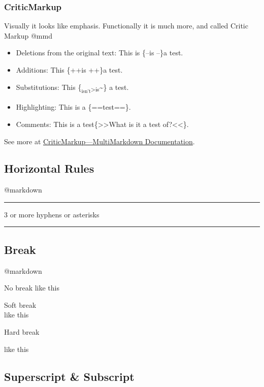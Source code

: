 \documentclass[]{article}
\providecommand{\tightlist}{%
  \setlength{\itemsep}{0pt}\setlength{\parskip}{0pt}}
\begin{document}
\subsubsection{CriticMarkup}\label{criticmarkup}

Visually it looks like emphasis. Functionally it is much more, and
called Critic Markup @mmd

\begin{itemize}
\tightlist
\item
  Deletions from the original text: This is \{--is --\}a test.
\item
  Additions: This \{++is ++\}a test.
\item
  Substitutions: This
  \{\textsubscript{\textsubscript{isn't}\textgreater{}is}\textasciitilde{}\}
  a test.
\item
  Highlighting: This is a \{==test==\}.
\item
  Comments: This is a test\{\textgreater{}\textgreater{}What is it a
  test of?\textless{}\textless{}\}.
\end{itemize}

See more at
\href{http://fletcher.github.io/MultiMarkdown-5/criticmarkup.html}{CriticMarkup---MultiMarkdown
Documentation}.

\subsection{Horizontal Rules}\label{horizontal-rules}

@markdown

\begin{center}\rule{0.5\linewidth}{\linethickness}\end{center}

3 or more hyphens or asterisks

\begin{center}\rule{0.5\linewidth}{\linethickness}\end{center}

\subsection{Break}\label{break}

@markdown

No break like this

Soft break\\
like this

Hard break

like this

\subsection{Superscript \& Subscript}\label{superscript-subscript}
\end{document}
